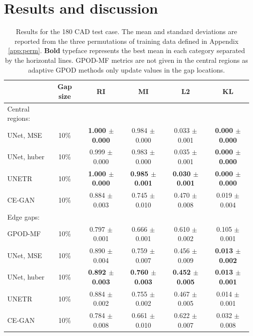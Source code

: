 \documentclass{article}
\begin{document}
\section{Results and discussion}
\begin{table}[t]
  \caption{Results for the 180 CAD test case. The mean and standard deviations are reported from the three permutations of training data defined in Appendix \ref{app:perm}. \textbf{Bold} typeface represents the best mean in each category separated by the horizontal lines. GPOD-MF metrics are not given in the central regions as adaptive GPOD methods only update values in the gap locations.}
  \label{tab:results}
  \centering
  \footnotesize
  \begin{tabular}{lccccc}
    \toprule
         & Gap size & RI     & MI  & L2 & KL \\
    \midrule
    Central regions: & & & & & \\
    \; UNet, MSE & 10\% & \textbf{1.000 $\pm$ 0.000} & 0.984 $\pm$ 0.000 & 0.033 $\pm$ 0.001 & \textbf{0.000 $\pm$ 0.000} \\
    \; UNet, huber & 10\% & 0.999 $\pm$ 0.000 & 0.983 $\pm$ 0.000  &  0.035 $\pm$ 0.001  & \textbf{0.000 $\pm$ 0.000} \\
    \; UNETR & 10\% & \textbf{1.000 $\pm$ 0.000} & \textbf{0.985 $\pm$ 0.001} & \textbf{0.030 $\pm$ 0.001}  & \textbf{0.000 $\pm$ 0.000} \\
    \; CE-GAN & 10\% & 0.884 $\pm$ 0.003 & 0.745 $\pm$ 0.010 & 0.470 $\pm$ 0.008  & 0.019 $\pm$ 0.004 \\
    \midrule
    Edge gaps: &&&&&\\
    \; GPOD-MF & 10\% & 0.797 $\pm$ 0.001 & 0.666 $\pm$ 0.001 & 0.610 $\pm$ 0.002 & 0.105 $\pm$ 0.001 \\
    \; UNet, MSE & 10\% & 0.890 $\pm$ 0.004 & 0.759 $\pm$ 0.007 & 0.456 $\pm$ 0.009 & \textbf{0.013 $\pm$ 0.002} \\
    \; UNet, huber & 10\% & \textbf{0.892 $\pm$ 0.003} & \textbf{0.760 $\pm$ 0.003}  &  \textbf{0.452 $\pm$ 0.005}  & \textbf{0.013 $\pm$ 0.001} \\
    \; UNETR & 10\% & 0.884 $\pm$ 0.002 & 0.755 $\pm$ 0.002 & 0.467 $\pm$ 0.005  & 0.014 $\pm$ 0.001 \\
    \; CE-GAN & 10\% & 0.784 $\pm$ 0.008 & 0.661 $\pm$ 0.010 & 0.622 $\pm$ 0.007  & 0.032 $\pm$ 0.008 \\

\end{tabular}
\end{table}
\end{document}
